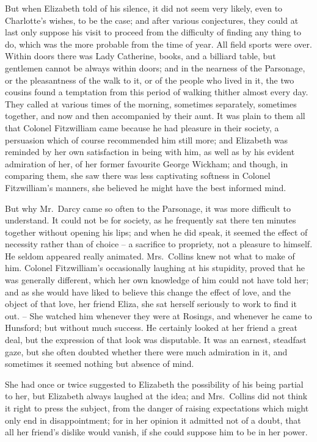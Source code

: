 But when Elizabeth told of his silence, it did not seem
very likely, even to Charlotte’s wishes, to be the case;
and after various conjectures, they could at last only
suppose his visit to proceed from the difficulty of finding
any thing to do, which was the more probable from the
time of year. All field sports were over. Within doors
there was Lady Catherine, books, and a billiard table,
but gentlemen cannot be always within doors; and in
the nearness of the Parsonage, or the pleasantness of the
walk to it, or of the people who lived in it, the two cousins
found a temptation from this period of walking thither
almost every day. They called at various times of the
morning, sometimes separately, sometimes together, and
now and then accompanied by their aunt. It was plain
to them all that Colonel Fitzwilliam came because he had
pleasure in their society, a persuasion which of course
recommended him still more; and Elizabeth was reminded
by her own satisfaction in being with him, as well as by
his evident admiration of her, of her former favourite
George Wickham; and though, in comparing them, she
saw there was less captivating softness in Colonel Fitzwilliam’s
manners, she believed he might have the best
informed mind.

But why Mr.\ Darcy came so often to the Parsonage,
it was more difficult to understand. It could not be for
society, as he frequently sat there ten minutes together
without opening his lips; and when he did speak, it
seemed the effect of necessity rather than of choice -- a
sacrifice to propriety, not a pleasure to himself. He
seldom appeared really animated. Mrs.\ Collins knew not
what to make of him. Colonel Fitzwilliam’s occasionally
laughing at his stupidity, proved that he was generally
different, which her own knowledge of him could not
have told her; and as she would have liked to believe
this change the effect of love, and the object of that love,
her friend Eliza, she sat herself seriously to work to find
it out. -- She watched him whenever they were at Rosings,
and whenever he came to Hunsford; but without much
success. He certainly looked at her friend a great deal,
but the expression of that look was disputable. It was
an earnest, steadfast gaze, but she often doubted whether
there were much admiration in it, and sometimes it seemed
nothing but absence of mind.

She had once or twice suggested to Elizabeth the
possibility of his being partial to her, but Elizabeth
always laughed at the idea; and Mrs.\ Collins did not
think it right to press the subject, from the danger of
raising expectations which might only end in disappointment;
for in her opinion it admitted not of a doubt,
that all her friend’s dislike would vanish, if she could
suppose him to be in her power.

